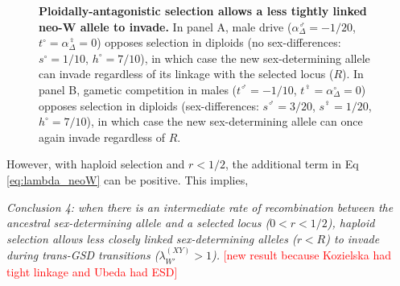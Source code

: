 \documentclass[10pt,letterpaper]{article}
\begin{document}
\begin{figure}[!h]
\centering
\caption{
{\bf Ploidally-antagonistic selection allows a less tightly linked neo-W allele to invade.}
In panel A, male drive ($\alpha^\male_{\Delta} = -1/20$, $t^\circ = \alpha^\female_{\Delta} = 0$) opposes selection in diploids (no sex-differences: $s^\circ = 1/10$, $h^\circ = 7/10$), in which case the new sex-determining allele can invade regardless of its linkage with the selected locus ($R$).   
In panel B, gametic competition in males ($t^\male = -1/10$, $t^\female = \alpha^\circ_{\Delta} = 0$) opposes selection in diploids (sex-differences: $s^\male = 3/20$, $s^\female = 1/20$, $h^\circ = 7/10$), in which case the new sex-determining allele can once again invade regardless of $R$.
}
\label{fig:Combination_Centimorgans}
\end{figure}

However, with haploid selection and $r<1/2$, the additional term in Eq \eqref{eq:lambda_neoW} can be positive.
This implies, 
\vspace{0.5cm}

\noindent\textit{Conclusion 4: when there is an intermediate rate of recombination between the ancestral sex-determining allele and a selected locus ($0<r<1/2$), haploid selection allows less closely linked sex-determining alleles ($r<R$) to invade during trans-GSD transitions ($\lambda_{W'}^{(XY)}>1$).}
\textcolor{red}{[new result because Kozielska had tight linkage and Ubeda had ESD]}
\vspace{0.5cm}
\end{document}
